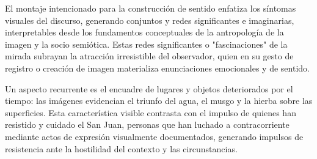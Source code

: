 El montaje intencionado para la construcción de sentido enfatiza los síntomas visuales del discurso, generando conjuntos y redes significantes e imaginarias, interpretables desde los fundamentos conceptuales de la antropología de la imagen y la socio semiótica. Estas redes significantes o "fascinaciones" de la mirada subrayan la atracción irresistible del observador, quien en su gesto de registro o creación de imagen materializa enunciaciones emocionales y de sentido.

Un aspecto recurrente es el encuadre de lugares y objetos deteriorados por el tiempo: las imágenes evidencian el triunfo del agua, el musgo y la hierba sobre las superficies. Esta característica visible contrasta con el impulso de quienes han resistido y cuidado el San Juan, personas que han luchado a contracorriente mediante actos de expresión visualmente documentados, generando impulsos de resistencia ante la hostilidad del contexto y las circunstancias.
